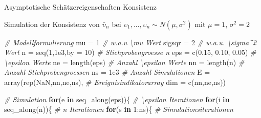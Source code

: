 \documentclass[
  8pt,
  ignorenonframetext,
]{beamer}
\newenvironment{Shaded}{\begin{snugshade}}{\end{snugshade}}
\newcommand{\AttributeTok}[1]{\textcolor[rgb]{0.77,0.63,0.00}{#1}}
\newcommand{\CommentTok}[1]{\textcolor[rgb]{0.56,0.35,0.01}{\textit{#1}}}
\newcommand{\ConstantTok}[1]{\textcolor[rgb]{0.00,0.00,0.00}{#1}}
\newcommand{\ControlFlowTok}[1]{\textcolor[rgb]{0.13,0.29,0.53}{\textbf{#1}}}
\newcommand{\DecValTok}[1]{\textcolor[rgb]{0.00,0.00,0.81}{#1}}
\newcommand{\FloatTok}[1]{\textcolor[rgb]{0.00,0.00,0.81}{#1}}
\newcommand{\FunctionTok}[1]{\textcolor[rgb]{0.00,0.00,0.00}{#1}}
\newcommand{\NormalTok}[1]{#1}
\newcommand{\OtherTok}[1]{\textcolor[rgb]{0.56,0.35,0.01}{#1}}
\newcommand{\SpecialCharTok}[1]{\textcolor[rgb]{0.00,0.00,0.00}{#1}}
\newcommand{\ups} {\upsilon}
\begin{document}
\begin{frame}[fragile]{\small Asymptotische Schätzereigenschaften
\textbar{} Konsistenz}
\protect\hypertarget{asymptotische-schuxe4tzereigenschaften-konsistenz-1}{}
\small
\vspace{2mm}

Simulation der Konsistenz von \(\bar{\ups}_n\) bei
\(\ups_1,...,\ups_n \sim N(\mu,\sigma^2)\) mit \(\mu = 1\),
\(\sigma^2 = 2\)

\footnotesize
{}
\vspace{2mm}

\begin{Shaded}
\begin{Highlighting}[]
\CommentTok{\# Modellformulierung}
\NormalTok{mu      }\OtherTok{=} \DecValTok{1}                                         \CommentTok{\# w.a.u \textbackslash{}mu Wert}
\NormalTok{sigsqr  }\OtherTok{=} \DecValTok{2}                                         \CommentTok{\# w.a.u. \textbackslash{}sigma\^{}2 Wert}
\NormalTok{n       }\OtherTok{=} \FunctionTok{seq}\NormalTok{(}\DecValTok{1}\NormalTok{,}\FloatTok{1e3}\NormalTok{,}\AttributeTok{by =} \DecValTok{10}\NormalTok{)                        }\CommentTok{\# Stichprobengroesse n}
\NormalTok{eps     }\OtherTok{=} \FunctionTok{c}\NormalTok{(}\FloatTok{0.15}\NormalTok{, }\FloatTok{0.10}\NormalTok{, }\FloatTok{0.05}\NormalTok{)                       }\CommentTok{\# \textbackslash{}epsilon Werte}
\NormalTok{ne      }\OtherTok{=} \FunctionTok{length}\NormalTok{(eps)                               }\CommentTok{\# Anzahl \textbackslash{}epsilon Werte}
\NormalTok{nn      }\OtherTok{=} \FunctionTok{length}\NormalTok{(n)                                 }\CommentTok{\# Anzahl Stichprobengroessen}
\NormalTok{ns      }\OtherTok{=} \FloatTok{1e3}                                       \CommentTok{\# Anzahl Simulationen}
\NormalTok{E       }\OtherTok{=} \FunctionTok{array}\NormalTok{(}\FunctionTok{rep}\NormalTok{(}\ConstantTok{NaN}\NormalTok{,nn,ne,ns),                  }\CommentTok{\# Ereignisindikatorarray}
                \AttributeTok{dim =} \FunctionTok{c}\NormalTok{(nn,ne,ns))}

\CommentTok{\# Simulation}
\ControlFlowTok{for}\NormalTok{(e }\ControlFlowTok{in} \FunctionTok{seq\_along}\NormalTok{(eps))\{                           }\CommentTok{\# \textbackslash{}epsilon Iterationen}
    \ControlFlowTok{for}\NormalTok{(i }\ControlFlowTok{in} \FunctionTok{seq\_along}\NormalTok{(n))\{                         }\CommentTok{\# n Iterationen}
        \ControlFlowTok{for}\NormalTok{(s }\ControlFlowTok{in} \DecValTok{1}\SpecialCharTok{:}\NormalTok{ns)\{                             }\CommentTok{\# Simulationsiterationen}


\end{Highlighting}
\end{Shaded}
\end{frame}
\end{document}
